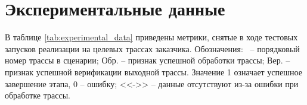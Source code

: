 \section{Экспериментальные данные} \label{app:experimental_data}

В таблице \ref{tab:experimental_data} приведены метрики, снятые в ходе тестовых запусков реализации на целевых трассах заказчика. Обозначения: \textnumero \, -- порядковый номер трассы в сценарии; Обр. -- признак успешной обработки трассы; Вер. -- признак успешной верификации выходной трассы. Значение 1 означает успешное завершение этапа, 0 -- ошибку; <<->> -- данные отсутствуют из-за ошибки при обработке трассы.

\begingroup
\scriptsize
\setlength{\tabcolsep}{3.5pt}
\setlength{\LTleft}{\fill}
\setlength{\LTright}{\fill}
\renewcommand{\arraystretch}{1.08}

